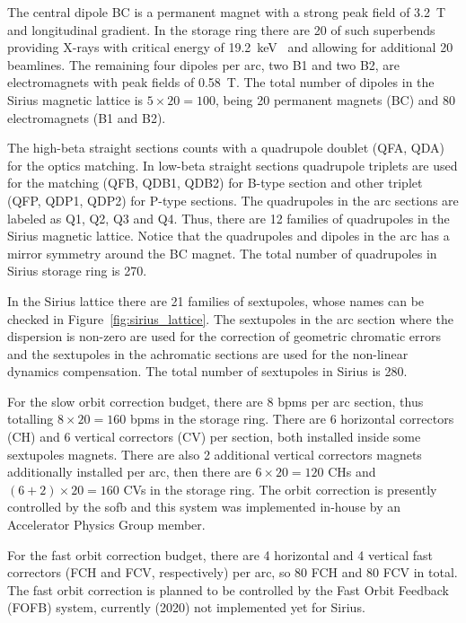 The central dipole BC is a permanent magnet with a strong peak field of \SI{3.2}{\tesla} and longitudinal gradient. In the storage ring there are 20 of such superbends providing X-rays with critical energy of \SI{19.2}{\kilo\electronvolt}~\cite{Liu2016b} and allowing for additional 20 beamlines. The remaining four dipoles per arc, two B1 and two B2, are electromagnets with peak fields of \SI{0.58}{\tesla}. The total number of dipoles in the Sirius magnetic lattice is $5 \times 20 = 100$, being 20 permanent magnets (BC) and 80 electromagnets (B1 and B2).

The high-beta straight sections counts with a quadrupole doublet (QFA, QDA) for the optics matching. In low-beta straight sections quadrupole triplets are used for the matching (QFB, QDB1, QDB2) for B-type section and other triplet (QFP, QDP1, QDP2) for P-type sections. The quadrupoles in the arc sections are labeled as Q1, Q2, Q3 and Q4. Thus, there are 12 families of quadrupoles in the Sirius magnetic lattice. Notice that the quadrupoles and dipoles in the arc has a mirror symmetry around the BC magnet. The total number of quadrupoles in Sirius storage ring is 270. 

In the Sirius lattice there are 21 families of sextupoles, whose names can be checked in Figure~\ref{fig:sirius_lattice}. The sextupoles in the arc section where the dispersion is non-zero are used for the correction of geometric chromatic errors and the sextupoles in the achromatic sections are used for the non-linear dynamics compensation. The total number of sextupoles in Sirius is 280.

For the slow orbit correction budget, there are 8 \glspl{bpm} per arc section, thus totalling $8 \times 20 = 160$ \glspl{bpm} in the storage ring. There are 6 horizontal correctors (CH) and 6 vertical correctors (CV) per section, both installed inside some sextupoles magnets. There are also 2 additional vertical correctors magnets additionally installed per arc, then there are $6 \times 20 = 120$ CHs and $(6 + 2) \times 20 = 160$ CVs in the storage ring. The orbit correction is presently controlled by the \gls{sofb} and this system was implemented in-house by an Accelerator Physics Group member.

For the fast orbit correction budget, there are 4 horizontal and 4 vertical fast correctors (FCH and FCV, respectively) per arc, so 80 FCH and 80 FCV in total. The fast orbit correction is planned to be controlled by the Fast Orbit Feedback (FOFB) system, currently (2020) not implemented yet for Sirius.

